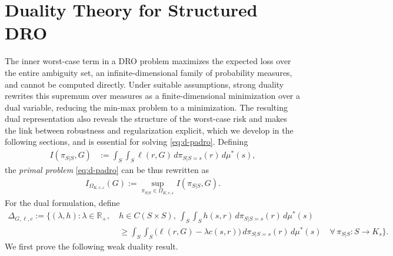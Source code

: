 \documentclass{article}
\newcommand{\R}{\mathbb{R}} %
\newcommand{\Okc}{\Omega_{K, c, \varepsilon}}
\newcommand{\D}{\Delta_{G,\ell, c}}
\theoremstyle{definition}
\theoremstyle{remarksty}
\begin{document}
\section{Duality Theory for Structured DRO}\label{sec:duality}
The inner worst-case term in a DRO problem maximizes the expected loss over the entire ambiguity set, an infinite-dimensional family of probability measures, and cannot be computed directly. Under suitable assumptions, strong duality rewrites this supremum over measures as a finite-dimensional minimization over a dual variable, reducing the min-max problem to a minimization. The resulting dual representation also reveals the structure of the worst-case risk and makes the link between robustness and regularization explicit, which we develop in the following sections, and is essential for solving \eqref{eq:d-padro}. 
Defining
\begin{align*}
    I(\pi_{S|S}, G) &:= \int_S\int_S \ell(r,G)\,d\pi_{S|S=s}(r)\,d\mu^*(s),
\end{align*}
the \emph{primal problem} \eqref{eq:d-padro} can be thus rewritten as 
\begin{align*}
I_{\Okc}(G) := \sup_{\pi_{S|S} \in \Okc} I(\pi_{S|S}, G).
\end{align*}
For the dual formulation, define
\begin{align*}
    \D := \Big\{ (\lambda,h) : \lambda \in \R_+,\ & h\in C(S\times S),\ \int_S\int_S h(s,r)\,d\pi_{S|S=s}(r)\,d\mu^*(s) \\
    &\geq \int_S\int_S \big(\ell(r, G) - \lambda c(s, r)\big)\,d\pi_{S|S=s}(r)\,d\mu^*(s) \quad \forall\, \pi_{S|S} : S \rightarrow K_s \Big\}.
\end{align*}
We first prove the following weak duality result.
\end{document}
